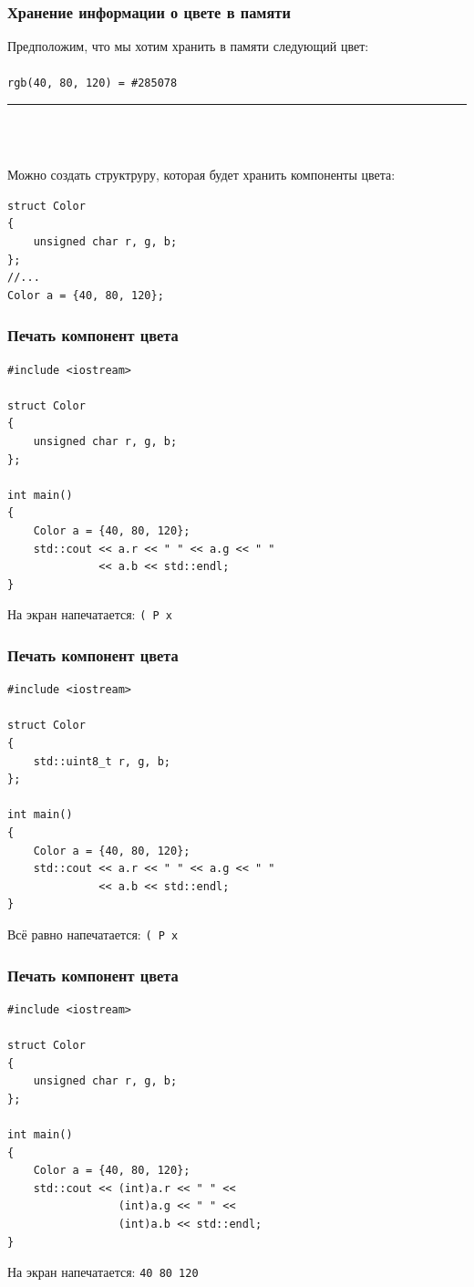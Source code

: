 \documentclass[10pt,pdf,hyperref={unicode}]{beamer}
\begin{document}
\begin{frame}[fragile]
\frametitle{Хранение информации о цвете в памяти}
\newcommand{\cboxx}{\hspace{9mm}\rule[-1mm]{40mm}{5mm}}

Предположим, что мы хотим хранить в памяти следующий цвет:\\
\hfill\\
\raggedleft
\texttt{rgb(40, 80, 120) = \#285078}	\textcolor[HTML]{285078}{\cboxx}\\
\raggedright

\hfill\\
Можно создать структруру, которая будет хранить компоненты цвета:\\
\begin{lstlisting}
struct Color 
{
    unsigned char r, g, b;
};
//...
Color a = {40, 80, 120};
\end{lstlisting}
\end{frame}


\begin{frame}[fragile]
\frametitle{Печать компонент цвета}
\begin{lstlisting}
#include <iostream>

struct Color 
{
    unsigned char r, g, b;
};

int main()
{
    Color a = {40, 80, 120};
    std::cout << a.r << " " << a.g << " " 
              << a.b << std::endl;
}
\end{lstlisting}
На экран напечатается: \texttt{( P x}
\end{frame}

\begin{frame}[fragile]
\frametitle{Печать компонент цвета}
\begin{lstlisting}
#include <iostream>

struct Color 
{
    std::uint8_t r, g, b;
};

int main()
{
    Color a = {40, 80, 120};
    std::cout << a.r << " " << a.g << " " 
              << a.b << std::endl;
}
\end{lstlisting}
Всё равно напечатается: \texttt{( P x}
\end{frame}

\begin{frame}[fragile]
\frametitle{Печать компонент цвета}
\begin{lstlisting}
#include <iostream>

struct Color 
{
    unsigned char r, g, b;
};

int main()
{
    Color a = {40, 80, 120};
    std::cout << (int)a.r << " " << 
                 (int)a.g << " " << 
                 (int)a.b << std::endl;
}
\end{lstlisting}
На экран напечатается: \texttt{40 80 120}
\end{frame}
\end{document}
